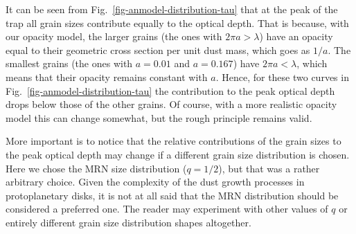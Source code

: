 \documentclass{aa}
\begin{document}
It can be seen from Fig.~\ref{fig-anmodel-distribution-tau} that at the peak of
the trap all grain sizes contribute equally to the optical depth. That is
because, with our opacity model, the larger grains (the ones with $2\pi a >
\lambda$) have an opacity equal to their geometric cross section per unit dust
mass, which goes as $1/a$. The smallest grains (the ones with $a=0.01$ and
$a=0.167$) have $2\pi a < \lambda$, which means that their opacity remains
constant with $a$. Hence, for these two curves in
Fig.~\ref{fig-anmodel-distribution-tau} the contribution to the peak optical
depth drops below those of the other grains. Of course, with a more realistic
opacity model this can change somewhat, but the rough principle remains valid.

More important is to notice that the relative contributions of the grain sizes
to the peak optical depth may change if a different grain size distribution is
chosen. Here we chose the MRN size distribution ($q=1/2$), but that was a rather
arbitrary choice. Given the complexity of the dust growth processes in
protoplanetary disks, it is not at all said that the MRN distribution should be
considered a preferred one. The reader may experiment with other values of
$q$ or entirely different grain size distribution shapes altogether.
\end{document}
